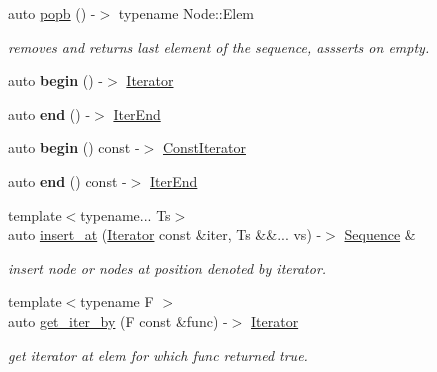 \begin{DoxyCompactItemize}
auto \mbox{\hyperlink{structSequence_a7821f89dc1b96a00f9f77e7a64abdb89}{popb}} () -\/$>$ typename Node\+::\+Elem
\begin{DoxyCompactList}\small\item\em removes and returns last element of the sequence, assserts on empty. \end{DoxyCompactList}\item 
\mbox{\label{structSequence_a65dc00103314be565e405d2d0a063aff}} 
auto {\bfseries begin} () -\/$>$ \mbox{\hyperlink{structSequence_1_1Iterator}{Iterator}}
\item 
\mbox{\label{structSequence_a0d382198a064e565b5888a99a1154522}} 
auto {\bfseries end} () -\/$>$ \mbox{\hyperlink{structSequence_1_1IterEnd}{Iter\+End}}
\item 
\mbox{\label{structSequence_affd1314b189a3aad60865acde06326d6}} 
auto {\bfseries begin} () const -\/$>$ \mbox{\hyperlink{structSequence_1_1ConstIterator}{Const\+Iterator}}
\item 
\mbox{\label{structSequence_a2e722c899dfbc2e4aaac02d7a5c886af}} 
auto {\bfseries end} () const -\/$>$ \mbox{\hyperlink{structSequence_1_1IterEnd}{Iter\+End}}
\item 
{\footnotesize template$<$typename... Ts$>$ }\\auto \mbox{\hyperlink{structSequence_a3018160acb26652616019865aff91dde}{insert\+\_\+at}} (\mbox{\hyperlink{structSequence_1_1Iterator}{Iterator}} const \&iter, Ts \&\&... vs) -\/$>$ \mbox{\hyperlink{structSequence}{Sequence}} \&
\begin{DoxyCompactList}\small\item\em insert node or nodes at position denoted by iterator. \end{DoxyCompactList}\item 
{\footnotesize template$<$typename F $>$ }\\auto \mbox{\hyperlink{structSequence_ad1f8bf2f99679f9893cd77cdbadd0732}{get\+\_\+iter\+\_\+by}} (F const \&func) -\/$>$ \mbox{\hyperlink{structSequence_1_1Iterator}{Iterator}}
\begin{DoxyCompactList}\small\item\em get iterator at elem for which func returned true. \end{DoxyCompactList}\item 

\end{DoxyCompactItemize}
